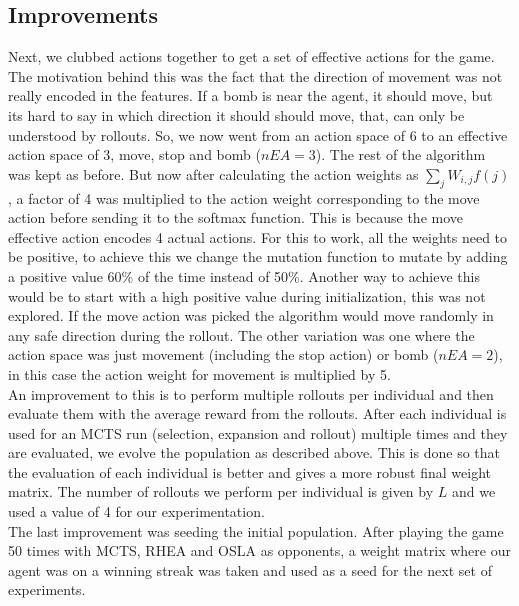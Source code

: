 \documentclass{llncs}
\begin{document}
\subsection{Improvements}
Next, we  clubbed actions together to get a set of effective actions for the game. The motivation behind this was the fact that the direction of movement was not really encoded in the features. If a bomb is near the agent, it should move, but its hard to say in which direction it should should move, that, can only be understood by rollouts. So, we now went from an action space of 6 to an effective action space of 3, move, stop and bomb ($nEA = 3$). The rest of the algorithm was kept as before. But now after calculating the action weights as $\sum_{j} W_{i,j}f(j)$, a factor of 4 was multiplied to the action weight corresponding to the move action before sending it to the softmax function. This is because the move effective action encodes 4 actual actions. For this to work, all the weights need to be positive, to achieve this we change the mutation function to mutate by adding a positive value 60\% of the time instead of 50\%. Another way to achieve this would be to start with a high positive value during initialization, this was not explored. If the move action was picked the algorithm would move randomly in any safe direction during the rollout. The other variation was one where the action space was just movement (including the stop action) or bomb ($nEA = 2$), in this case the action weight for movement is multiplied by 5. \\

\noindent
An improvement to this is to perform multiple rollouts per individual and then evaluate them with the average reward from the rollouts. After each individual is used for an MCTS run (selection, expansion and rollout) multiple times and they are evaluated, we evolve the population as described above. This is done so that the evaluation of each individual is better and gives a more robust final weight matrix. The number of rollouts we perform per individual is given by $L$ and we used a value of 4 for our experimentation.\\

\noindent
The last improvement was seeding the initial population. After playing the game 50 times with MCTS, RHEA and OSLA as opponents, a weight matrix where our agent was on a winning streak was taken and used as a seed for the next set of experiments.
\end{document}
